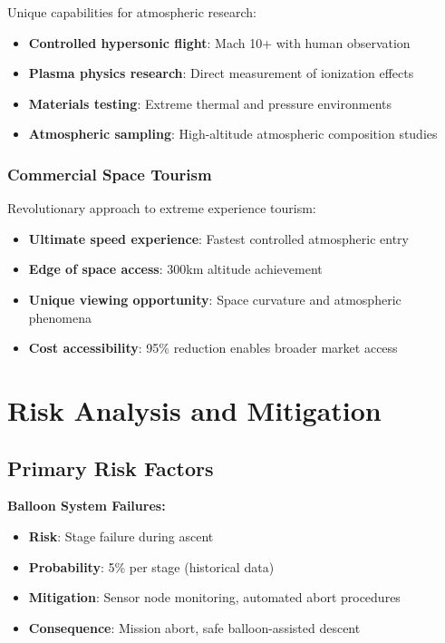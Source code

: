 \documentclass[11pt,a4paper]{article}
\begin{document}
Unique capabilities for atmospheric research:
\begin{itemize}
    \item \textbf{Controlled hypersonic flight}: Mach 10+ with human observation
    \item \textbf{Plasma physics research}: Direct measurement of ionization effects
    \item \textbf{Materials testing}: Extreme thermal and pressure environments
    \item \textbf{Atmospheric sampling}: High-altitude atmospheric composition studies
\end{itemize}

\subsubsection{Commercial Space Tourism}

Revolutionary approach to extreme experience tourism:
\begin{itemize}
    \item \textbf{Ultimate speed experience}: Fastest controlled atmospheric entry
    \item \textbf{Edge of space access}: 300km altitude achievement
    \item \textbf{Unique viewing opportunity}: Space curvature and atmospheric phenomena
    \item \textbf{Cost accessibility}: 95\% reduction enables broader market access
\end{itemize}

\section{Risk Analysis and Mitigation}

\subsection{Primary Risk Factors}

\textbf{Balloon System Failures:}
\begin{itemize}
    \item \textbf{Risk}: Stage failure during ascent
    \item \textbf{Probability}: 5\% per stage (historical data)
    \item \textbf{Mitigation}: Sensor node monitoring, automated abort procedures
    \item \textbf{Consequence}: Mission abort, safe balloon-assisted descent
\end{itemize}
\end{document}
